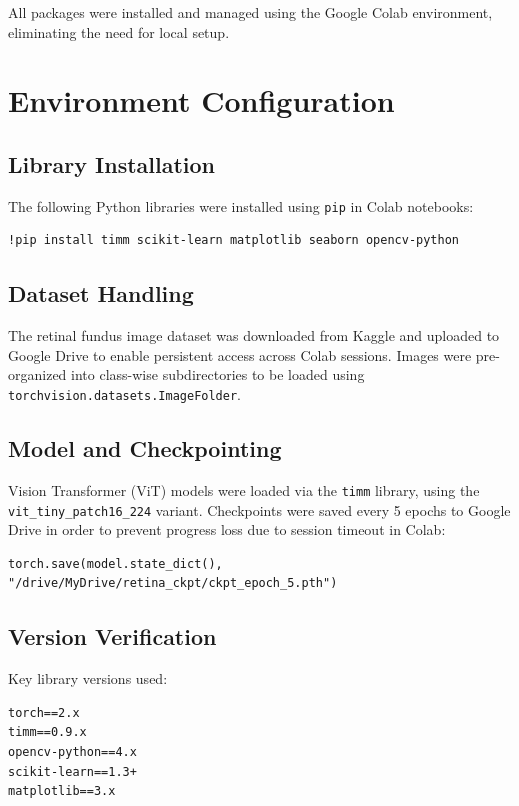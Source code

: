 \documentclass[a4paper,12pt]{report}
\begin{document}
\vspace{0.3cm}
All packages were installed and managed using the Google Colab environment, eliminating the need for local setup.

\section{Environment Configuration}

\subsection{Library Installation}

The following Python libraries were installed using \texttt{pip} in Colab notebooks:
\begin{verbatim}
!pip install timm scikit-learn matplotlib seaborn opencv-python
\end{verbatim}

\subsection{Dataset Handling}

The retinal fundus image dataset was downloaded from Kaggle and uploaded to Google Drive to enable persistent access across Colab sessions. Images were pre-organized into class-wise subdirectories to be loaded using \texttt{torchvision.datasets.ImageFolder}.

\subsection{Model and Checkpointing}

Vision Transformer (ViT) models were loaded via the \texttt{timm} library, using the \texttt{vit\_tiny\_patch16\_224} variant. Checkpoints were saved every 5 epochs to Google Drive in order to prevent progress loss due to session timeout in Colab:
\begin{verbatim}
torch.save(model.state_dict(), "/drive/MyDrive/retina_ckpt/ckpt_epoch_5.pth")
\end{verbatim}

\subsection{Version Verification}

Key library versions used:
\begin{verbatim}
torch==2.x
timm==0.9.x
opencv-python==4.x
scikit-learn==1.3+
matplotlib==3.x
\end{verbatim}
\end{document}
